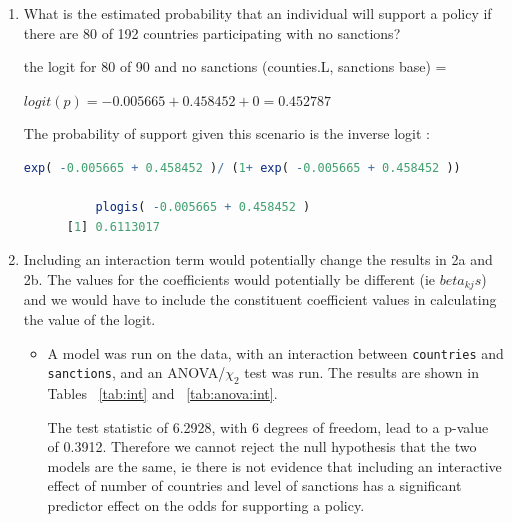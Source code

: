 \documentclass[12pt,letterpaper]{article}
\begin{document}
\begin{enumerate}
\begin{enumerate}
		\item
		What is the estimated probability that an individual will support a policy if there are 80 of 192 countries participating with no sanctions? 
		
		the logit for 80 of 90 and no sanctions (counties.L,  sanctions base) =  
		
		$logit(p) = -0.005665 + 0.458452 + 0 = 0.452787$
		
		The probability of support given this scenario is the inverse logit :
		
		\begin{lstlisting}[language = R]
		  exp( -0.005665 + 0.458452 )/ (1+ exp( -0.005665 + 0.458452 ))
		
		  plogis( -0.005665 + 0.458452 )
      [1] 0.6113017
		\end{lstlisting}

		\item
		
		Including an interaction term would potentially change the results in 2a and 2b.  The values for the coefficients would potentially be different (ie $beta_{kj}s$) and we would have to include the constituent coefficient values in calculating the value of the logit.
		
		\begin{itemize}

			\item A model was run on the data, with an interaction between \texttt{countries} and \texttt{sanctions}, and an ANOVA/$\chi_2$ test was run.  The results are shown in Tables ~\ref{tab:int} and ~\ref{tab:anova:int}.
			
			The test statistic of 6.2928, with 6 degrees of freedom, lead to a p-value of 0.3912.  Therefore we cannot reject the null hypothesis that the two models are the same, ie there is not evidence that including an interactive effect of number of countries and level of sanctions has a significant predictor effect on the odds for supporting a policy. 
			
      


\end{itemize}
\end{enumerate}
\end{enumerate}
\end{document}

